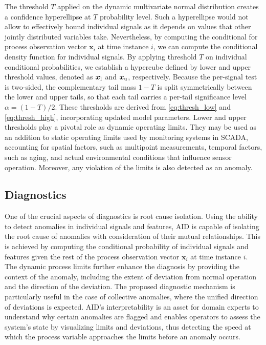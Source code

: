 The threshold $T$ applied on the dynamic multivariate normal distribution creates a confidence hyperellipse at $T$ probability level. Such a hyperellipse would not allow to effectively bound individual signals as it depends on values that other jointly distributed variables take. Nevertheless, by computing the conditional for process observation vector $\boldsymbol{x}_i$ at time instance $i$, we can compute the conditional density function for individual signals. By applying threshold $T$ on individual conditional probabilities, we establish a hypercube defined by lower and upper threshold values, denoted as $\boldsymbol{x} _{\text{l}}$ and $\boldsymbol{x} _{\text{u}}$, respectively. Because the per-signal test is two-sided, the complementary tail mass $1 - T$ is split symmetrically between the lower and upper tails, so that each tail carries a per-tail significance level $\alpha = (1 - T)/2$. These thresholds are derived from \eqref{eq:thresh_low} and \eqref{eq:thresh_high}, incorporating updated model parameters. Lower and upper thresholds play a pivotal role as dynamic operating limits. They may be used as an addition to static operating limits used by monitoring systems in SCADA, accounting for spatial factors, such as multipoint measurements, temporal factors, such as aging, and actual environmental conditions that influence sensor operation. Moreover, any violation of the limits is also detected as an anomaly.

\subsection{Diagnostics}\label{diagnosis}
One of the crucial aspects of diagnostics is root cause isolation. Using the ability to detect anomalies in individual signals and features, AID is capable of isolating the root cause of anomalies with consideration of their mutual relationships. This is achieved by computing the conditional probability of individual signals and features given the rest of the process observation vector $\boldsymbol{x}_i$ at time instance $i$. The dynamic process limits further enhance the diagnosis by providing the context of the anomaly, including the extent of deviation from normal operation and the direction of the deviation. The proposed diagnostic mechanism is particularly useful in the case of collective anomalies, where the unified direction of deviations is expected. AID's interpretability is an asset for domain experts to understand why certain anomalies are flagged and enables operators to assess the system's state by visualizing limits and deviations, thus detecting the speed at which the process variable approaches the limits before an anomaly occurs.

